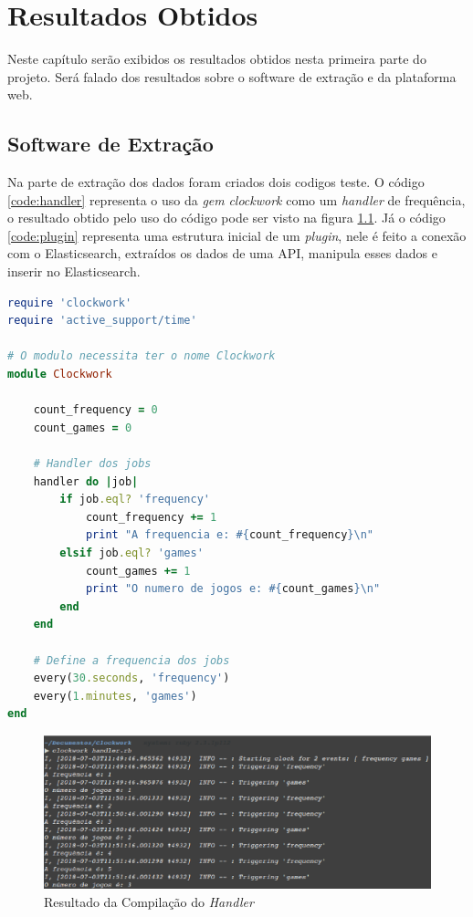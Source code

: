 \chapter[Resultados Obtidos]{Resultados Obtidos}
Neste capítulo serão exibidos os resultados obtidos nesta primeira parte do projeto. Será falado dos resultados sobre o software de extração e da plataforma web.
\section{Software de Extração}
Na parte de extração dos dados foram criados dois codigos teste. O código \ref{code:handler} representa o uso da \textit{gem} \textit{clockwork} como um \textit{handler} de frequência, o resultado obtido pelo uso do código pode ser visto na figura \ref{image:result_handler}. Já o código \ref{code:plugin} representa uma estrutura inicial de um \textit{plugin}, nele é feito a conexão com o Elasticsearch, extraídos os dados de uma API, manipula esses dados e inserir no Elasticsearch.
\begin{lstlisting}[language={Ruby}, caption = {Código do \textit{Handler}}, label = {code:handler}]
require 'clockwork'
require 'active_support/time'

# O modulo necessita ter o nome Clockwork
module Clockwork

	count_frequency = 0
	count_games = 0

	# Handler dos jobs
	handler do |job|
		if job.eql? 'frequency'
			count_frequency += 1
			print "A frequencia e: #{count_frequency}\n"
		elsif job.eql? 'games'
			count_games += 1
			print "O numero de jogos e: #{count_games}\n"
		end
	end

	# Define a frequencia dos jobs
	every(30.seconds, 'frequency')
	every(1.minutes, 'games')
end
\end{lstlisting}
\begin{figure}
\centering
\includegraphics[scale=0.6]{figuras/result_handler.eps}
\caption{Resultado da Compilação do \textit{Handler}}
\label{image:result_handler}
\end{figure}
